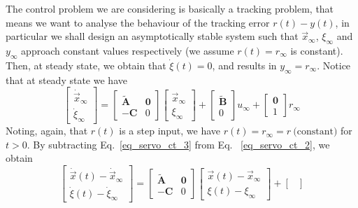 \documentclass[12pt,a4paper,oneside]{book}
\begin{document}
\begin{onehalfspace}
The control problem we are considering is basically a tracking problem, that 
means we want to analyse the behaviour of the tracking error $r(t) - y(t)$, in 
particular we shall design an asymptotically stable system such that 
$\vec{x}_{\infty}$, $\xi_{\infty}$ and $y_{\infty}$ approach constant values 
respectively (we assume $r(t)=r_{\infty}$ is constant). Then, at steady state, 
we obtain that $\dot{\xi}(t)=0$, and results in $y_{\infty} = r_{\infty}$.
Notice that at steady state we have
\begin{equation}\label{eq_servo_ct_3}
	\begin{bmatrix}
		\dot{\vec{x}}_{\infty} \\[6pt] \dot{\xi}_{\infty}
	\end{bmatrix} = 
	\begin{bmatrix}
		\tilde{\mathbf{A}} & \mathbf{0} \\[6pt]
		-{\mathbf{C}} & 0
	\end{bmatrix} 
	\begin{bmatrix}
		{\vec{x}}_{\infty} \\[6pt] {\xi}_{\infty}
	\end{bmatrix}+
	\begin{bmatrix}
		\tilde{\mathbf{B}} \\[6pt] 0
	\end{bmatrix}u_{\infty}+
	\begin{bmatrix}
		{\mathbf{0}} \\[6pt] 1
	\end{bmatrix}r_{\infty}
\end{equation}
Noting, again, that $r(t)$ is a step input, we have $r(t)=r_{\infty} = r\ 
\text{(constant)}$ for $t > 0$. By subtracting Eq.~\eqref{eq_servo_ct_3} from 
Eq.~
\ref{eq_servo_ct_2}, we obtain
\begin{equation}\label{eq_servo_ct_4}
	\begin{bmatrix}
		\dot{\vec{x}}(t) - \dot{\vec{x}}_{\infty} \\[6pt] 
		\dot{\xi}(t)-\dot{\xi}_{\infty}
	\end{bmatrix} = 
	\begin{bmatrix}
		\tilde{\mathbf{A}} & \mathbf{0} \\[6pt]
		-{\mathbf{C}} & 0
	\end{bmatrix} 
	\begin{bmatrix}
		\vec{x}(t)-{\vec{x}}_{\infty} \\[6pt] {\xi}(t)-{\xi}_{\infty}
	\end{bmatrix}+
	\begin{bmatrix}

\end{bmatrix}
\end{equation}
\end{onehalfspace}
\end{document}
